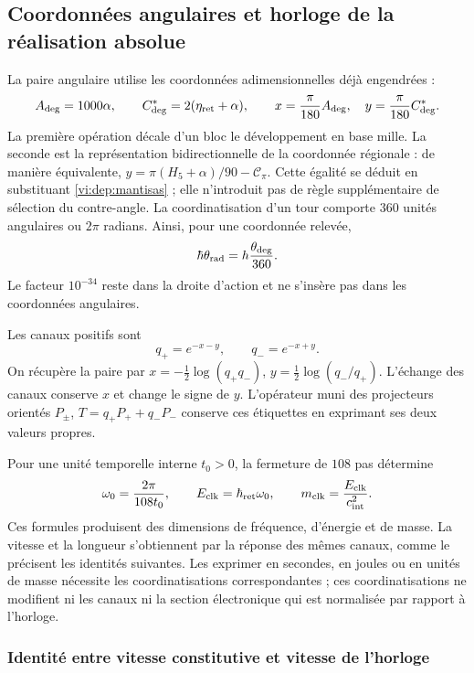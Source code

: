 \subsection{Coordonnées angulaires et horloge de la réalisation absolue}
\label{vi:dep:reloj}

La paire angulaire utilise les coordonnées adimensionnelles déjà engendrées :
\begin{equation}
 A_{\deg}=1000\alpha,\qquad
 C^*_{\deg}=2(\eta_{\rm ret}+\alpha),\qquad
 x=\frac{\pi}{180}A_{\deg},\quad
 y=\frac{\pi}{180}C^*_{\deg}.
 \label{vi:dep:angulos}
\end{equation}
La première opération décale d’un bloc le développement en base mille.
La seconde est la représentation bidirectionnelle de la coordonnée régionale :
de manière équivalente,
\(y=\pi(H_5+\alpha)/90-\mathcal C_\pi\).
Cette égalité se déduit en substituant \eqref{vi:dep:mantisas} ; elle
n’introduit pas de règle supplémentaire de sélection du contre-angle.
La coordinatisation d’un tour comporte \(360\) unités angulaires ou \(2\pi\)
radians. Ainsi, pour une coordonnée relevée,
\[
 \hbar\theta_{\rm rad}
 =h\frac{\theta_{\deg}}{360}.
\]
Le facteur \(10^{-34}\) reste dans la droite d’action et ne
s’insère pas dans les coordonnées angulaires.

Les canaux positifs sont
\[
 q_+=e^{-x-y},\qquad q_-=e^{-x+y}.
\]
On récupère la paire par
\(x=-\tfrac12\log(q_+q_-)\),
\(y=\tfrac12\log(q_-/q_+)\). L’échange des canaux conserve
\(x\) et change le signe de \(y\). L’opérateur muni des projecteurs
orientés \(P_\pm\),
\(T=q_+P_++q_-P_-\) conserve ces étiquettes en exprimant ses deux
valeurs propres.

Pour une unité temporelle interne \(t_0>0\), la fermeture de \(108\)
pas détermine
\begin{equation}
 \omega_0=\frac{2\pi}{108t_0},\qquad
 E_{\rm clk}=\hbar_{\rm ret}\omega_0,
 \qquad m_{\rm clk}=\frac{E_{\rm clk}}{c_{\rm int}^{2}}.
 \label{vi:dep:reloj-absoluto}
\end{equation}
Ces formules produisent des dimensions de fréquence, d’énergie et de masse.
La vitesse et la longueur s’obtiennent par la réponse des
mêmes canaux, comme le précisent les identités suivantes. Les exprimer
en secondes, en joules ou en unités de masse nécessite les coordinatisations
correspondantes ; ces coordinatisations ne modifient ni les canaux ni la section
électronique qui est normalisée par rapport à l’horloge.

\subsubsection{Identité entre vitesse constitutive et vitesse de l’horloge}

